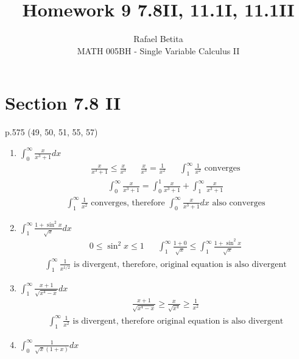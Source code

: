 \documentclass[12pt]{article}
\title{Homework 9 7.8II, 11.1I, 11.1II}
\author{Rafael Betita\\
MATH 005BH - Single Variable Calculus II}
\begin{document}
\maketitle

\newpage\section{Section 7.8 II }
p.575 (49, 50, 51, 55, 57)
\begin{enumerate}
    \addtocounter{enumi}{48}
    \item$\int_0^\infty\frac{x}{x^3+1}dx$
        \begin{align*}
            \frac{x}{x^3+1} \leq \frac{x}{x^3} && \frac{x}{x^3} = \frac{1}{x^2}
            && \int_1^\infty\frac{1}{x^2} \text{ converges}
        \end{align*}
        \begin{align*}
            \int_0^\infty\frac{x}{x^3+1} = \int_0^1\frac{x}{x^3+1} + \int_1^\infty\frac{x}{x^3+1}
        \end{align*}
        \begin{align*}
            \int_1^\infty\frac{1}{x^2} \text{ converges, therefore }  \int_0^\infty\frac{x}{x^3+1}dx \text{ also converges}
        \end{align*}
    \item $\int_1^\infty\frac{1+\sin^2x}{\sqrt{x}}dx$
        \begin{align*}
            0 \leq \sin^2x \leq 1 && \int_1^\infty \frac{1+0}{\sqrt{x}} \leq \int_1^\infty \frac{1+\sin^2x}{\sqrt{x}} 
        \end{align*}
        \begin{align*}
             \int_1^\infty \frac{1}{x^{1/2}} \text{ is divergent, therefore, original equation is also divergent}
        \end{align*}
    \item $\int_1^\infty\frac{x+1}{\sqrt{x^4-x}}dx$
        \begin{align*}
            \frac{x+1}{\sqrt{x^4-x}} \geq 
            \frac{x}{\sqrt{x^4}} \geq
            \frac{1}{x^2}
        \end{align*}
        \begin{align*}
            \text{$\int_1^\infty\frac{1}{x^2}$ is divergent, therefore original equation is also divergent}
        \end{align*}
    \newpage\addtocounter{enumi}{3}\item $\int_0^\infty\frac{1}{\sqrt{x}(1+x)}dx$ \quad \\\\\textwidth{The interval is improper for two reasons: The interval $[0, \infty)$ is infinite and the integrand has an infinite discontinuity at 0. Evaluate it by expressing it as a sum of improper integrals of Type 2 and Type 1 as follows:}\\

\end{enumerate}
\end{document}

